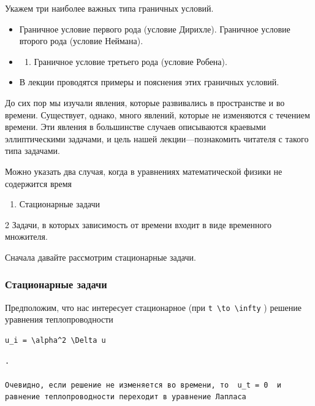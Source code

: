 \documentclass[
  ukrainian,
]{article}
\providecommand{\tightlist}{%
  \setlength{\itemsep}{0pt}\setlength{\parskip}{0pt}}
\begin{document}
Укажем три наиболее важных типа граничных условий.

\begin{itemize}
\tightlist
\item
  Граничное условие первого рода (условие Дирихле). Граничное условие
  второго рода (условие Неймана).
\item
  \begin{enumerate}
  \def\labelenumi{\arabic{enumi}.}
  \setcounter{enumi}{2}
  \tightlist
  \item
    Граничное условие третьего рода (условие Робена).
  \end{enumerate}
\item
  В лекции проводятся примеры и пояснения этих граничных условий.
\end{itemize}

До сих пор мы изучали явления, которые развивались в пространстве и во
времени. Существует, однако, много явлений, которые не изменяются с
течением времени. Эти явления в большинстве случаев описываются краевыми
эллиптическими задачами, и цель нашей лекции---познакомить читателя с
такого типа задачами.

Можно указать два случая, когда в уравнениях математической физики не
содержится время

\begin{enumerate}
\def\labelenumi{\arabic{enumi}.}
\tightlist
\item
  Стационарные задачи
\end{enumerate}

2 Задачи, в которых зависимость от времени входит в виде временного
множителя.

Сначала давайте рассмотрим стационарные задачи.

\subsubsection{Стационарные
задачи}\label{ux441ux442ux430ux446ux438ux43eux43dux430ux440ux43dux44bux435-ux437ux430ux434ux430ux447ux438}

Предположим, что нас интересует стационарное (при
\texttt{t\ \textbackslash{}to\ \textbackslash{}infty} ) решение
уравнения теплопроводности

\begin{verbatim}
u_i = \alpha^2 \Delta u
\end{verbatim}

\begin{verbatim}
.

Очевидно, если решение не изменяется во времени, то  u_t = 0  и равнение теплопроводности переходит в уравнение Лапласа
\end{verbatim}
\end{document}

